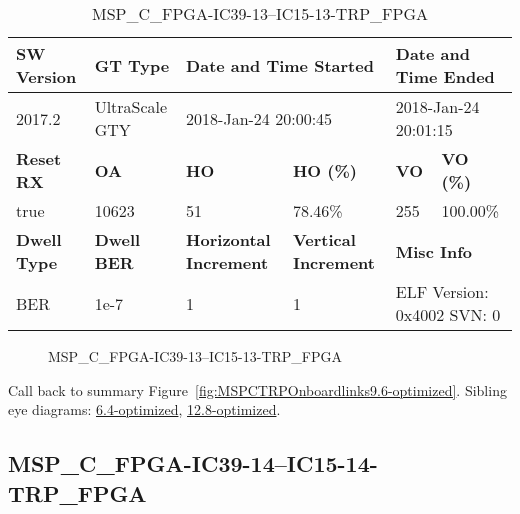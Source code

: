 \begin{table}[h]
\centering
\caption{MSP\_C\_FPGA-IC39-13--IC15-13-TRP\_FPGA}
\label{tab:MSPCFPGAIC3913IC1513TRPFPGA9.6-optimized}
\begin{tabular}{@{}|l|l|l|l|l|l|@{}}
\toprule
\textbf{SW Version}                & \textbf{GT Type}   & \multicolumn{2}{l|}{\textbf{Date and Time Started}}            & \multicolumn{2}{l|}{\textbf{Date and Time Ended}}        \\ \midrule
2017.2                       & UltraScale GTY          & \multicolumn{2}{l|}{2018-Jan-24 20:00:45}                   & \multicolumn{2}{l|}{2018-Jan-24 20:01:15}               \\ \midrule
\textbf{Reset RX}                  & \textbf{OA} & \textbf{HO}   & \textbf{HO (\%)} & \textbf{VO} & \textbf{VO (\%)} \\ \midrule
true & 10623        & 51          & 78.46\%        & 255        & 100.00\%       \\ \midrule
\textbf{Dwell Type}                & \textbf{Dwell BER} & \textbf{Horizontal Increment} & \textbf{Vertical Increment}    & \multicolumn{2}{l|}{\textbf{Misc Info}}                  \\ \midrule
BER                            & 1e-7        & 1        & 1           & \multicolumn{2}{l|}{ELF Version: 0x4002 SVN: 0}                         \\ \bottomrule
\end{tabular}
\end{table}

\begin{figure}[h]
\caption{MSP\_C\_FPGA-IC39-13--IC15-13-TRP\_FPGA} \label{fig:MSPCFPGAIC3913IC1513TRPFPGA9.6-optimized}
\end{figure}

Call back to summary Figure~\ref{fig:MSPCTRPOnboardlinks9.6-optimized}.
Sibling eye diagrams: \hyperref[sec:MSPCFPGAIC3913IC1513TRPFPGA6.4-optimized]{6.4-optimized}, \hyperref[sec:MSPCFPGAIC3913IC1513TRPFPGA12.8-optimized]{12.8-optimized}.

\clearpage
\newpage


\subsection{MSP\_C\_FPGA-IC39-14--IC15-14-TRP\_FPGA}\label{sec:MSPCFPGAIC3914IC1514TRPFPGA9.6-optimized}

